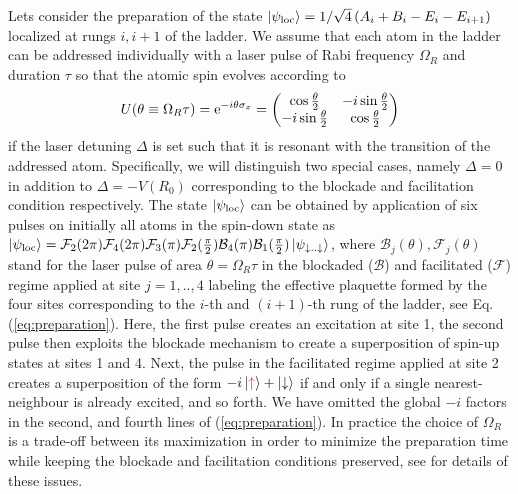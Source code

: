 \documentclass[prl,aps,twocolumn,showpacs,superscriptaddress,longbibliography]{revtex4-1}
\newcommand{\ran}{\right\rangle}
\newcommand{\ket}[1]{\left| #1 \ran}
\begin{document}
Lets consider the preparation of the state $\ket{\psi_{\rm loc}} = 1/\sqrt{4} \left( A_i + B_i - E_i - E_{i+1} \right)$ localized at rungs $i,i+1$ of the ladder. We assume that each atom in the ladder can be addressed individually with a laser pulse of Rabi frequency $\Omega_R$ and duration $\tau$ so that the atomic spin evolves according to 
\[
	U(\theta \equiv \Omega_R \tau) = {\rm e}^{-i \theta \sigma_x} = \begin{pmatrix} \cos \frac{\theta}{2} & -i \sin \frac{\theta}{2} \\
	-i \sin \frac{\theta}{2} & \cos \frac{\theta}{2}
	\end{pmatrix}
	\label{eq:U}
\]
if the laser detuning $\Delta$ is set such that it is resonant with the transition of the addressed atom. Specifically, we will distinguish two special cases, namely $\Delta=0$ in addition to $\Delta=-V(R_0)$ corresponding to the blockade and facilitation condition respectively. The state $\ket{\psi_{\rm loc}}$ can be obtained by application of six pulses on initially all atoms in the spin-down state as $\ket{\psi_{\rm loc}} = \mathcal{F}_2(2 \pi) \mathcal{F}_4(2 \pi) \mathcal{F}_3(\pi) \mathcal{F}_2(\frac{\pi}{2}) \mathcal{B}_4(\pi) \mathcal{B}_1(\frac{\pi}{2}) \ket{\psi_{\downarrow..\downarrow}}$, where $\mathcal{B}_j(\theta),\mathcal{F}_j(\theta)$ stand for the laser pulse of area $\theta=\Omega_R \tau$ in the blockaded ($\mathcal{B}$) and facilitated ($\mathcal{F}$) regime applied at site $j=1,..,4$ labeling the effective plaquette formed by the four sites corresponding to the $i$-th and $(i+1)$-th rung of the ladder, see Eq. (\ref{eq:preparation}). Here, the first pulse creates an excitation at site 1, the second pulse then exploits the blockade mechanism to create a superposition of spin-up states at sites 1 and 4. Next, the pulse in the facilitated regime applied at site 2 creates a superposition of the form $-i \ket{{\color{red} \uparrow}} + \ket{\downarrow}$ if and only if a single nearest-neighbour is already excited, and so forth. We have omitted the global $-i$ factors in the second, and fourth lines of (\ref{eq:preparation}). In practice the choice of $\Omega_R$ is a trade-off between its maximization in order to minimize the preparation time while keeping the blockade and facilitation conditions preserved, see \cite{a:Ostmann_17} for details of these issues.
\end{document}
